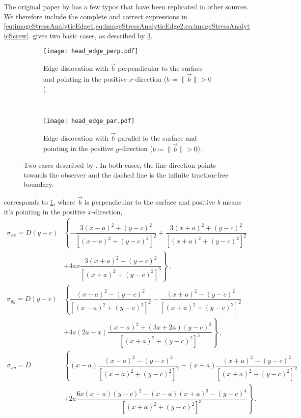 The original paper by \citet{head1953edge} has a few typos that have been replicated in other sources. We therefore include the complete and correct expressions in \cref{eq:imageStressAnalyticEdge1,eq:imageStressAnalyticEdge2,eq:imageStressAnalyticScrew}. \citet{head1953edge} gives two basic cases, as described by \cref{f:head_cases}.
\begin{figure}
  \centering
  \begin{subfigure}[b]{0.45\linewidth}
    \centering
    \texttt{[image: head\_edge\_perp.pdf]}
    \caption{Edge dislocation with $\vec{b}$ perpendicular to the surface and pointing in the positive $x$-direction ($b \coloneqq \lVert \vec{b} \rVert > 0$).}
    \label{sf:headCase1}
  \end{subfigure}
  ~
  \begin{subfigure}[b]{0.45\linewidth}
    \centering
    \texttt{[image: head\_edge\_par.pdf]}
    \caption{Edge dislocation with $\vec{b}$ parallel to the surface and pointing in the positive $y$-direction ($b \coloneqq \lVert \vec{b} \rVert > 0$).}
    \label{sf:headCase2}
  \end{subfigure}
  \caption{Two cases described by \citet{head1953edge}. In both cases, the line direction points towards the observer and the dashed line is the infinite traction-free boundary.}
  \label{f:head_cases}
\end{figure}
 corresponds to \cref{sf:headCase1}, where $\vec{b}$ is perpendicular to the surface and positive $b$ means it's pointing in the positive $x$-direction,
\begin{subequations}\label{eq:imageStressAnalyticEdge1}
  \begin{align}
    \sigma_{xx} = D (y - c) & \left\{-\dfrac{3 (x - a)^2 + (y - c)^2}{[(x - a)^2 + (y - c)^2]^2} + \dfrac{3 (x + a)^2 + (y - c)^2}{[(x + a)^2 + (y - c)^2]^2}\right.                                             \\\nonumber
                            & \left. + 4 a x \dfrac{3 (x + a)^2 - (y - c)^2}{[(x + a)^2 + (y - c)^2]^3}\right\}\,,                                                                                               \\
    \sigma_{yy} = D (y - c) & \left\{\dfrac{(x - a)^2 - (y - c)^2}{[(x - a)^2 + (y - c)^2]^2} - \dfrac{(x + a)^2 - (y - c)^2}{[(x + a)^2 + (y - c)^2]^2}                                                 \right. \\\nonumber
                            & \left. + 4 a (2 a - x) \dfrac{(x + a)^2 + (3 x + 2 a) (y - c)^2}{[(x + a)^2 + (y - c)^2]^3}\right\}\,,                                                                             \\
    \sigma_{xy} = D         & \left\{(x - a) \dfrac{(x - a)^2 - (y - c)^2}{[(x - a)^2 + (y - c)^2]^2} - (x + a) \dfrac{(x + a)^2 - (y - c)^2}{[(x + a)^2 + (y - c)^2]^2}\right.                                  \\\nonumber
                            & \left. + 2 a \dfrac{6 x (x + a) (y - c)^2 - (x - a) (x + a)^3 - (y - c)^4}{[(x + a)^2 + (y - c)^2]^3}\right\}\,.
  \end{align}
\end{subequations}
